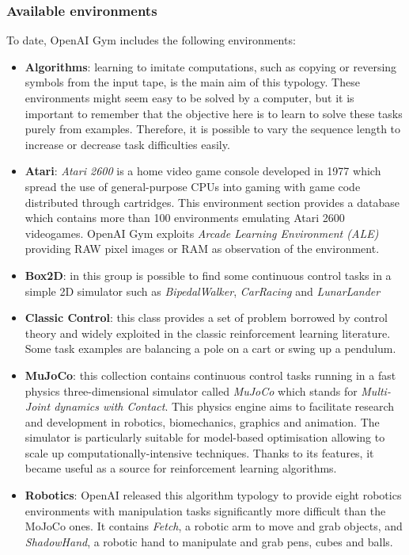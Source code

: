 \subsubsection{Available environments}

To date, OpenAI Gym includes the following environments:
\begin{itemize}
    \item \textbf{Algorithms}: learning to imitate computations, such as copying or reversing symbols from the input tape, is the main aim of this typology. These environments might seem easy to be solved by a computer, but it is important to remember that the objective here is to learn to solve these tasks purely from examples. Therefore, it is possible to vary the sequence length to increase or decrease task difficulties easily. 
    \item \textbf{Atari}: \textit{Atari 2600} is a home video game console developed in 1977 which spread the use of general-purpose CPUs into gaming with game code distributed through cartridges. This environment section provides a database which contains more than 100 environments emulating Atari 2600 videogames. OpenAI Gym exploits \textit{Arcade Learning Environment (ALE)} \cite{bellemare2013arcade} providing RAW pixel images or RAM as observation of the environment.
	\item \textbf{Box2D}: in this group is possible to find some continuous control tasks in a simple 2D simulator such as \textit{BipedalWalker}, \textit{CarRacing} and \textit{LunarLander}
	\item \textbf{Classic Control}: this class provides a set of problem borrowed by control theory and widely exploited in the classic reinforcement learning literature. Some task examples are balancing a pole on a cart or swing up a pendulum.
	\item \textbf{MuJoCo}: this collection contains continuous control tasks running in a fast physics three-dimensional simulator called \textit{MuJoCo} which stands for \textit{Multi-Joint dynamics with Contact}. This physics engine aims to facilitate research and development in robotics, biomechanics, graphics and animation. The simulator is particularly suitable for model-based optimisation allowing to scale up computationally-intensive techniques.
Thanks to its features, it became useful as a source for reinforcement learning algorithms. \cite{todorov2012mujoco}
	\item \textbf{Robotics}: OpenAI released this algorithm typology to provide eight robotics environments with manipulation tasks significantly more difficult than the MoJoCo ones. It contains \textit{Fetch}, a robotic arm to move and grab objects, and \textit{ShadowHand}, a robotic hand to manipulate and grab pens, cubes and balls. \cite{ingredientsRoboticsResearch}
\end{itemize}

